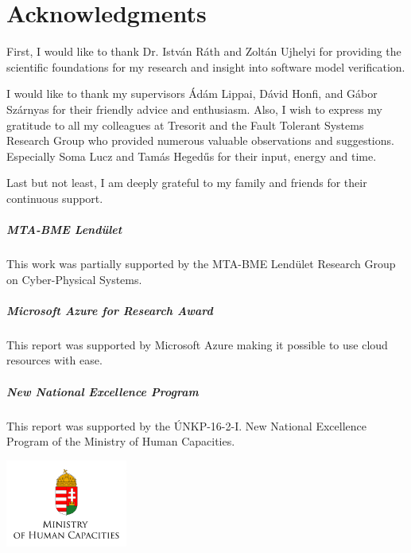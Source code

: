 \chapter*{Acknowledgments}
\label{chap:acknowledgments}
\thispagestyle{plain}

First, I would like to thank Dr. István Ráth and Zoltán Ujhelyi for providing the scientific foundations for my research and insight into software model verification.

I would like to thank my supervisors Ádám Lippai, Dávid Honfi, and Gábor Szárnyas for their friendly advice and enthusiasm. Also, I wish to express my gratitude to all my colleagues at Tresorit and the Fault Tolerant Systems Research Group who provided numerous valuable observations and suggestions. Especially Soma Lucz and Tamás Hegedűs for their input, energy and time.

Last but not least, I am deeply grateful to my family and friends for their continuous support.


\vfill

\paragraph{MTA-BME Lend\"ulet}
This work was partially supported by the MTA-BME Lend\"ulet Research Group on Cyber-Physical Systems.

\paragraph{Microsoft Azure for Research Award}
This report was supported by Microsoft Azure making it possible to use cloud resources with ease.

\paragraph{New National Excellence Program}
This report was supported by the ÚNKP-16-2-I. New National Excellence Program of the Ministry of Human Capacities.

\begin{center}
\includegraphics[width=0.3\textwidth]{include/figures/min_en.jpg}
\end{center}
